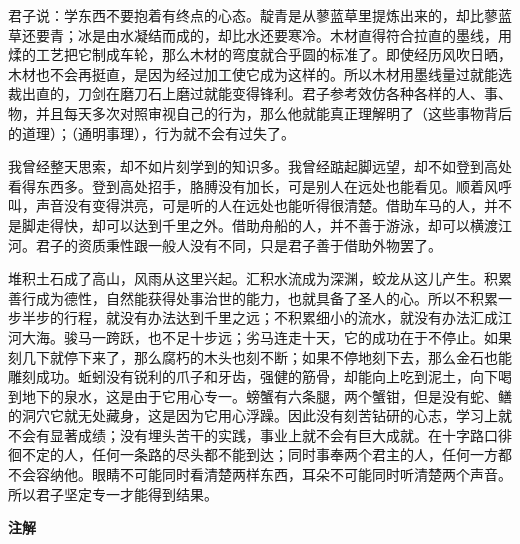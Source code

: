 \documentclass[12pt,UTF-8,openany,a4]{ctexbook}
\begin{document}
\begin{large}
    \yiwen 
    君子说：学东西不要抱着有终点的心态。靛青是从蓼蓝草里提炼出来的，却比蓼蓝草还要青；冰是由水凝结而成的，却比水还要寒冷。木材直得符合拉直的墨线，用煣的工艺把它制成车轮，那么木材的弯度就合乎圆的标准了。即使经历风吹日晒，木材也不会再挺直，是因为经过加工使它成为这样的。所以木材用墨线量过就能选裁出直的，刀剑在磨刀石上磨过就能变得锋利。君子参考效仿各种各样的人、事、物，并且每天多次对照审视自己的行为，那么他就能真正理解明了（这些事物背后的道理）；（通明事理），行为就不会有过失了。
    
    我曾经整天思索，却不如片刻学到的知识多。我曾经踮起脚远望，却不如登到高处看得东西多。登到高处招手，胳膊没有加长，可是别人在远处也能看见。顺着风呼叫，声音没有变得洪亮，可是听的人在远处也能听得很清楚。借助车马的人，并不是脚走得快，却可以达到千里之外。借助舟船的人，并不善于游泳，却可以横渡江河。君子的资质秉性跟一般人没有不同，只是君子善于借助外物罢了。
    
    堆积土石成了高山，风雨从这里兴起。汇积水流成为深渊，蛟龙从这儿产生。积累善行成为德性，自然能获得处事治世的能力，也就具备了圣人的心。所以不积累一步半步的行程，就没有办法达到千里之远；不积累细小的流水，就没有办法汇成江河大海。骏马一跨跃，也不足十步远；劣马连走十天，它的成功在于不停止。如果刻几下就停下来了，那么腐朽的木头也刻不断；如果不停地刻下去，那么金石也能雕刻成功。蚯蚓没有锐利的爪子和牙齿，强健的筋骨，却能向上吃到泥土，向下喝到地下的泉水，这是由于它用心专一。螃蟹有六条腿，两个蟹钳，但是没有蛇、鳝的洞穴它就无处藏身，这是因为它用心浮躁。因此没有刻苦钻研的心志，学习上就不会有显著成绩；没有埋头苦干的实践，事业上就不会有巨大成就。在十字路口徘徊不定的人，任何一条路的尽头都不能到达；同时事奉两个君主的人，任何一方都不会容纳他。眼睛不可能同时看清楚两样东西，耳朵不可能同时听清楚两个声音。所以君子坚定专一才能得到结果。
    
\end{large}


\newpage

\begin{Large}
    \noindent\textbf{注解}
\end{Large}


\vspace{-1em}
\end{document}

